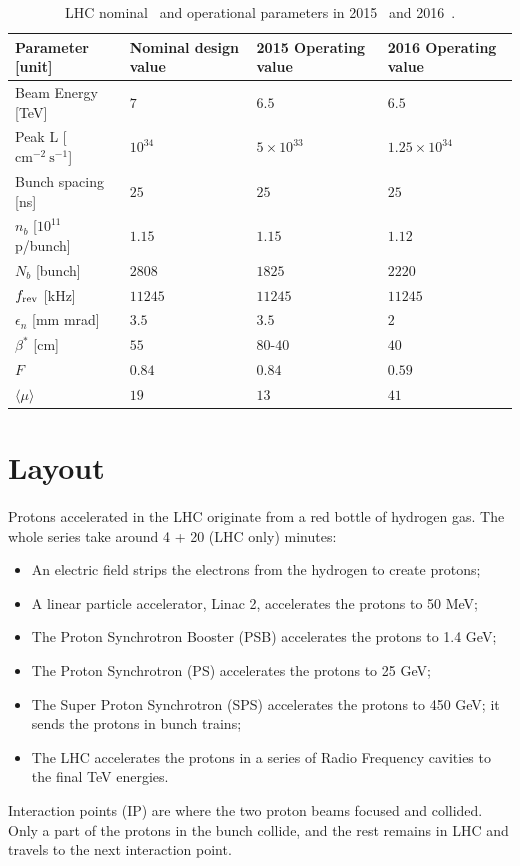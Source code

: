 \begin{table}[]
\centering
\begin{tabular*}{\textwidth}{@{\extracolsep{\fill}}llll}
\hline
Parameter [unit]   & Nominal design value & 2015 Operating value  & 2016 Operating value\\
\hline\hline
Beam Energy [TeV]  & $7$  & $6.5$  & $6.5$  \\
Peak L [$\text{cm}^{−2}~\text{s}^{-1}$]   & $10^{34}$ &   $5 \times 10^{33}$  & $1.25 \times 10^{34} $           \\
Bunch spacing [ns]             &      $25$  &  $25$ &      $25$ \\
$n_b$  [$10^{11}$ p/bunch]   & $1.15$ &  $1.15$ & $1.12$\\
$N_b$  [bunch]         & $2808$   &      $1825$ &      $2220$\\
$f_{\rm rev}$ [kHz]    &     $11245$  & $11245$  & $11245$ \\
$\epsilon_n$  [mm mrad]        & $3.5$ &  $3.5$  & $2$\\
$\beta^*$   [cm]         & $55$  &   $80$-$40$  & $40$\\
$F$        &      $0.84$  & $0.84$  &  $0.59$ \\
$\langle \mu \rangle$ & $19$ & $13$ & $41$ \\ \hline
\hline            
\end{tabular*}
\caption[LHC nominal and operational parameters]{LHC nominal~\cite{LHCPaper} and operational parameters in 2015~\cite{LHC_2015} and 2016~\cite{LHC_2016}.}
\label{Ch2:tab-lhc}
\end{table}

\section{Layout}
\paragraph{}
Protons accelerated in the LHC originate from a red bottle of hydrogen gas. The whole series take around 4 + 20 (LHC only) minutes:
\begin{itemize}
\item An electric field strips the electrons from the hydrogen to create protons; 
\item A linear particle accelerator, Linac 2, accelerates the protons to 50 MeV; 
\item The Proton Synchrotron Booster (PSB) accelerates the protons to 1.4 GeV;
\item The Proton Synchrotron (PS) accelerates the protons to 25 GeV; 
\item The Super Proton Synchrotron (SPS) accelerates the protons to 450 GeV; it sends the protons in bunch trains;
\item The LHC accelerates the protons in a series of Radio Frequency cavities to the final TeV energies.
\end{itemize}
Interaction points (IP) are where the two proton beams focused and collided. Only a part of the protons in the bunch collide, and the rest remains in LHC and travels to the next interaction point. 

